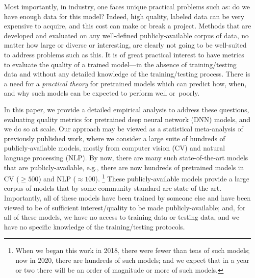 Most importantly, in industry, one faces unique practical problems such as: do we have enough data for this model? 
Indeed, high quality, labeled data can be very expensive to acquire, and this cost can make or break a project.
Methods that are developed and evaluated on any well-defined publicly-available corpus of data, no matter how large or diverse or interesting, are clearly not going to be well-suited to address problems such as this.
It is of great practical interest to have metrics to evaluate the quality of a trained model---in the absence of training/testing data and without any detailed knowledge of the training/testing process.  
There is a need for a \emph{practical theory} for pretrained models which can predict how, when, and why such models can be expected to perform well or~poorly.

In this paper, we provide a detailed empirical analysis to address these questions, evaluating quality metrics for pretrained deep neural network (DNN) models, and we do so at scale.
Our approach may be viewed as a statistical meta-analysis of previously published work, where we consider a large suite of hundreds of publicly-available models, mostly from computer vision (CV) and natural language processing (NLP).
%
By now, there are many such state-of-the-art models that are publicly-available, e.g., 
there are now hundreds of pretrained models in CV ($\ge 500$) and NLP ($\approx 100$).%
\footnote{When we began this work in 2018, there were fewer than tens of such models; now in 2020, there are hundreds of such models; and we expect that in a year or two there will be an order of magnitude or more of such models.}
These publicly-available models provide a large corpus of models that by some community standard are state-of-the-art. %
Importantly, all of these models have been trained by someone else and have been viewed to be of sufficient interest/quality to be made publicly-available; and, for all of these models, we have no access to training data or testing data, and we have no specific knowledge of the training/testing protocols. 


